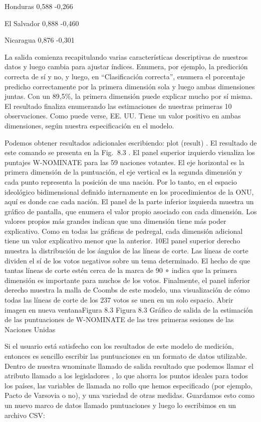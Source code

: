 \documentclass[
]{book}
\begin{document}
Honduras 0,588 -0,266

El Salvador 0,888 -0,460

Nicaragua 0,876 -0,301

La salida comienza recapitulando varias características descriptivas de nuestros datos y luego cambia para ajustar índices. Enumera, por ejemplo, la predicción correcta de sí y no, y luego, en ``Clasificación correcta'', enumera el porcentaje predicho correctamente por la primera dimensión sola y luego ambas dimensiones juntas. Con un 89,5\%, la primera dimensión puede explicar mucho por sí misma. El resultado finaliza enumerando las estimaciones de nuestras primeras 10 observaciones. Como puede verse, EE. UU. Tiene un valor positivo en ambas dimensiones, según nuestra especificación en el modelo.

Podemos obtener resultados adicionales escribiendo: plot (result) . El resultado de este comando se presenta en la Fig.  8.3 . El panel superior izquierdo visualiza los puntajes W-NOMINATE para las 59 naciones votantes. El eje horizontal es la primera dimensión de la puntuación, el eje vertical es la segunda dimensión y cada punto representa la posición de una nación. Por lo tanto, en el espacio ideológico bidimensional definido internamente en los procedimientos de la ONU, aquí es donde cae cada nación. El panel de la parte inferior izquierda muestra un gráfico de pantalla, que enumera el valor propio asociado con cada dimensión. Los valores propios más grandes indican que una dimensión tiene más poder explicativo. Como en todas las gráficas de pedregal, cada dimensión adicional tiene un valor explicativo menor que la anterior. 10El panel superior derecho muestra la distribución de los ángulos de las líneas de corte. Las líneas de corte dividen el sí de los votos negativos sobre un tema determinado. El hecho de que tantas líneas de corte estén cerca de la marca de 90 ∘ indica que la primera dimensión es importante para muchos de los votos. Finalmente, el panel inferior derecho muestra la malla de Coombs de este modelo, una visualización de cómo todas las líneas de corte de los 237 votos se unen en un solo espacio.
Abrir imagen en nueva ventanaFigura 8.3
Figura 8.3
Gráfico de salida de la estimación de las puntuaciones de W-NOMINATE de las tres primeras sesiones de las Naciones Unidas

Si el usuario está satisfecho con los resultados de este modelo de medición, entonces es sencillo escribir las puntuaciones en un formato de datos utilizable. Dentro de nuestra wnominate llamado de salida resultado que podemos llamar el atributo llamado a los legisladores , lo que ahorra los puntos ideales para todos los países, las variables de llamada no rollo que hemos especificado (por ejemplo, Pacto de Varsovia o no), y una variedad de otras medidas. Guardamos esto como un nuevo marco de datos llamado puntuaciones y luego lo escribimos en un archivo CSV:
\end{document}
